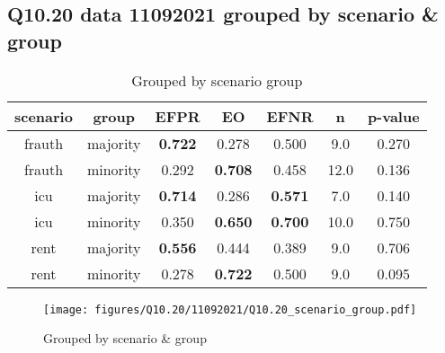 \subsection{Q10.20 data 11092021 grouped by scenario \& group}

\begin{comment}
                        EFPR        EO      EFNR     n    pvalue
(frauth, majority)  0.722222  0.277778  0.500000   9.0  0.269745
(frauth, minority)  0.291667  0.708333  0.458333  12.0  0.136180
(icu, majority)     0.714286  0.285714  0.571429   7.0  0.139712
(icu, minority)     0.350000  0.650000  0.700000  10.0  0.750316
(rent, majority)    0.555556  0.444444  0.388889   9.0  0.705735
(rent, minority)    0.277778  0.722222  0.500000   9.0  0.094671
\end{comment}

\begin{table}[h]
    \centering
    \begin{tabular}{|c|c|c|c|c|c|c|}
        \hline
        scenario & group & EFPR & EO & EFNR & n & p-value\\
        \hline
        frauth & majority & \textbf{0.722} & 0.278 & 0.500 & 9.0 & 0.270\\
		frauth & minority & 0.292 & \textbf{0.708} & 0.458 & 12.0 & 0.136\\
		icu & majority & \textbf{0.714} & 0.286 & \textbf{0.571} & 7.0 & 0.140\\
		icu & minority & 0.350 & \textbf{0.650} & \textbf{0.700} & 10.0 & 0.750\\
		rent & majority & \textbf{0.556} & 0.444 & 0.389 & 9.0 & 0.706\\
		rent & minority & 0.278 & \textbf{0.722} & 0.500 & 9.0 & 0.095\\
		
        \hline
    \end{tabular}
    \caption{Grouped by scenario group}
    \label{tab:my_label}
\end{table}
\begin{figure}[h]
    \centering
    \texttt{[image: figures/Q10.20/11092021/Q10.20\_scenario\_group.pdf]}
    \caption{Grouped by scenario \& group}
    \label{fig:my_label}
\end{figure}
